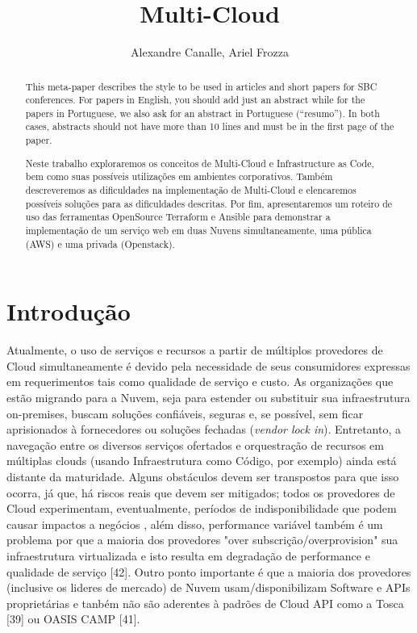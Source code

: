 \documentclass[12pt]{article}
\title{Multi-Cloud}
\author{Alexandre Canalle\inst{1}, Ariel Frozza\inst{1}}
\begin{document}

\sloppy
\maketitle
	
\begin{abstract}
	This meta-paper describes the style to be used in articles and short papers
	for SBC conferences. For papers in English, you should add just an abstract
	while for the papers in Portuguese, we also ask for an abstract in
	Portuguese (``resumo''). In both cases, abstracts should not have more than
	10 lines and must be in the first page of the paper.
\end{abstract}

\begin{abstract} 
	Neste trabalho exploraremos os conceitos de Multi-Cloud e Infrastructure as Code, bem como suas possíveis utilizações em ambientes corporativos. Também descreveremos as dificuldades na implementação de Multi-Cloud e elencaremos possíveis soluções para as dificuldades descritas.  Por fim, apresentaremos um roteiro de uso das ferramentas OpenSource Terraform e Ansible para demonstrar a implementação de um serviço web em duas Nuvens simultaneamente, uma pública (AWS) e uma privada (Openstack).
\end{abstract}

	\section{Introdução}
	    Atualmente, o uso de serviços e recursos a partir de múltiplos provedores de Cloud simultaneamente é devido pela necessidade de seus consumidores expressas em requerimentos tais como qualidade de serviço e custo. As organizações que estão migrando para a Nuvem, seja para estender ou substituir sua infraestrutura on-premises, buscam soluções confiáveis, seguras e, se possível, sem ficar aprisionados à fornecedores ou soluções fechadas (\textit{vendor lock in}). Entretanto, a navegação entre os diversos serviços ofertados e orquestração de recursos em múltiplas clouds (usando Infraestrutura como Código, por exemplo) ainda está distante da maturidade. Alguns obstáculos devem ser transpostos para que isso ocorra, já que, há riscos reais que devem ser mitigados; todos os provedores de Cloud experimentam, eventualmente, períodos de indisponibilidade que podem causar impactos a negócios \cite{Ferrer:2012}, além disso, performance variável também é um problema por que a maioria dos provedores "over subscrição/overprovision" sua infraestrutura virtualizada e isto resulta em degradação de performance e qualidade de serviço [42]. Outro ponto importante é que a maioria dos provedores (inclusive os lideres de mercado) de Nuvem usam/disponibilizam Software e APIs proprietárias e tanbém não são aderentes à padrões de Cloud API como a Tosca [39] ou OASIS CAMP [41].
	    
\end{document}
